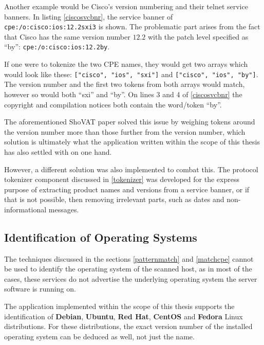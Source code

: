 \documentclass[a4paper,12pt]{article}
\begin{document}
	Another example would be Cisco's version numbering and their telnet service banners. In listing \ref{ciscosvcbnr}, the service banner of \texttt{cpe:/o:cisco:ios:12.2sxi3} is shown. The problematic part arises from the fact that Cisco has the same version number $12.2$ with the patch level specified as ``by'': \texttt{cpe:/o:cisco:ios:12.2by}.
	
	If one were to tokenize the two CPE names, they would get two arrays which would look like these: \texttt{["cisco", "ios", "sxi"]} and \texttt{["cisco", "ios", "by"]}. The version number and the first two tokens from both arrays would match, however so would both ``sxi'' and ``by''. On lines 3 and 4 of \ref{ciscosvcbnr} the copyright and compilation notices both contain the word/token ``by''.

	The aforementioned ShoVAT\cite{shovat15} paper solved this issue by weighing tokens around the version number more than those further from the version number, which solution is ultimately what the application written within the scope of this thesis has also settled with on one hand.
	
	However, a different solution was also implemented to combat this. The protocol tokenizer component discussed in \ref{tokenizer} was developed for the express purpose of extracting product names and versions from a service banner, or if that is not possible, then removing irrelevant parts, such as dates and non-informational messages.
	
\subsection{Identification of Operating Systems} \label{opsysmatcher}
 

	The techniques discussed in the sections \ref{patternmatch} and \ref{matchcpe} cannot be used to identify the operating system of the scanned host, as in most of the cases, these services do not advertise the underlying operating system the server software is running on.
	
	The application implemented within the scope of this thesis supports the identification of \textbf{Debian}, \textbf{Ubuntu}, \textbf{Red Hat}, \textbf{CentOS} and \textbf{Fedora} Linux distributions. For these distributions, the exact version number of the installed operating system can be deduced as well, not just the name.
	
\end{document}
